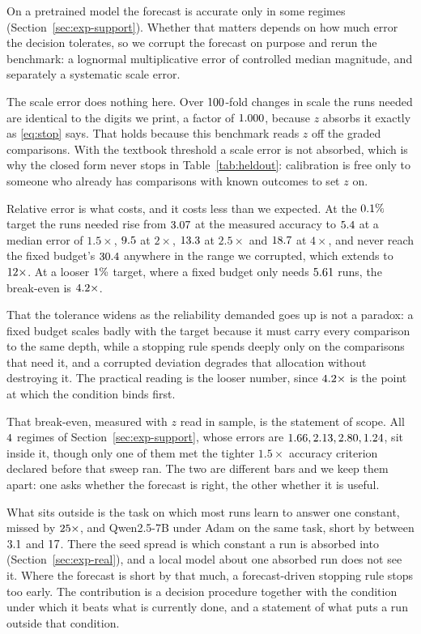 On a pretrained model the forecast is accurate only in some regimes
(Section~\ref{sec:exp-support}). Whether that matters depends on how much error the decision
tolerates, so we corrupt the forecast on purpose and rerun the benchmark: a lognormal
multiplicative error of controlled median magnitude, and separately a systematic scale error.

The scale error does nothing here. Over $100$-fold changes in scale the runs needed
are identical to the digits we print, a factor of $1.000$, because $z$ absorbs it
exactly as \eqref{eq:stop} says. That holds because this benchmark reads $z$ off the graded
comparisons. With the textbook threshold a scale error is not absorbed, which is why the closed
form never stops in Table~\ref{tab:heldout}: calibration is free only to someone who already has
comparisons with known outcomes to set $z$ on.

Relative error is what costs, and it costs less than we expected. At the
$0.1\%$ target the runs needed rise from $3.07$ at the measured accuracy to
$5.4$ at a median error of $1.5\times$, $9.5$ at $2\times$,
$13.3$ at $2.5\times$ and $18.7$ at $4\times$, and never reach the
fixed budget's $30.4$ anywhere in the range we corrupted, which extends to
$12\times$. At a looser $1\%$ target, where a fixed budget only needs
$5.61$ runs, the break-even is $4.2\times$.

That the tolerance widens as the reliability demanded goes up is not a paradox: a fixed budget
scales badly with the target because it must carry every comparison to the same depth, while a
stopping rule spends deeply only on the comparisons that need it, and a corrupted deviation
degrades that allocation without destroying it. The practical reading is the looser number, since
$4.2\times$ is the point at which the condition binds first.

That break-even, measured with $z$ read in sample, is the statement of scope. All
$4$ regimes of Section~\ref{sec:exp-support}, whose errors are $1.66, 2.13, 2.80, 1.24$, sit
inside it, though only one of them met the tighter
$1.5\times$ accuracy criterion declared before that sweep ran. The two are different bars and we
keep them apart: one asks whether the forecast is right, the other whether it is useful.

What sits outside is the task on which most runs learn to answer one constant, missed by
$25\times$, and Qwen2.5-7B under Adam on the same task, short by between
$3.1$ and $17$. There the seed spread is which
constant a run is absorbed into (Section~\ref{sec:exp-real}), and a local model about one absorbed
run does not see it. Where the forecast is short by that much, a
forecast-driven stopping rule stops too early. The contribution is a decision procedure
together with the condition under which it beats what is currently done, and a statement of what
puts a run outside that condition.
